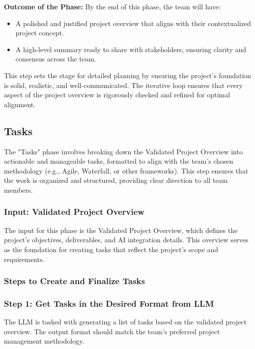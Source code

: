 \documentclass[14pt, a4paper]{article}
\begin{document}
\textbf{Outcome of the Phase:} By the end of this phase, the team will have:

\begin{itemize}
    \item A polished and justified project overview that aligns with their
    contextualized project concept.
    \item A high-level summary ready to share with stakeholders, ensuring
    clarity and consensus across the team.
\end{itemize}

This step sets the stage for detailed planning by ensuring the project’s
foundation is solid, realistic, and well-communicated. The iterative loop
ensures that every aspect of the project overview is rigorously checked and
refined for optimal alignment.

\subsection{Tasks}

The "Tasks" phase involves breaking down the Validated Project Overview into
actionable and manageable tasks, formatted to align with the team's chosen
methodology (e.g., Agile, Waterfall, or other frameworks). This step ensures
that the work is organized and structured, providing clear direction to all team
members.

\subsubsection{Input: Validated Project Overview}

The input for this phase is the Validated Project Overview, which defines the
project’s objectives, deliverables, and AI integration details. This overview
serves as the foundation for creating tasks that reflect the project’s scope and
requirements.

\subsubsection{Steps to Create and Finalize Tasks}

\subsubsection*{Step 1: Get Tasks in the Desired Format from LLM }

The LLM is tasked with generating a list of tasks based on the validated project
overview. The output format should match the team’s preferred project management
methodology.
\end{document}

